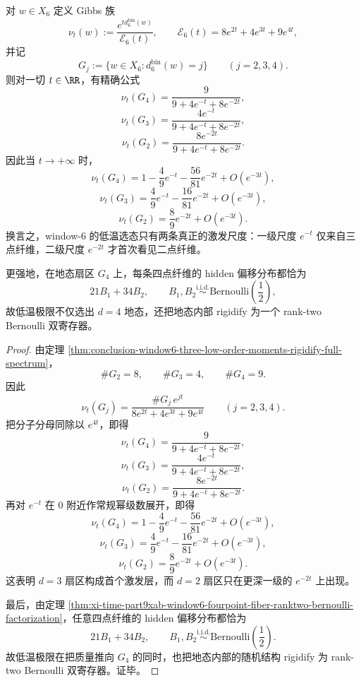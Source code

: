 \begin{theorem}\label{thm:conclusion-window6-two-gap-freezing-ranktwo-bernoulli-groundstate}
对 \(w\in X_6\) 定义 Gibbs 族
\[
\nu_t(w):=\frac{e^{t d_6^{\mathrm{bin}}(w)}}{\mathcal E_6(t)},
\qquad
\mathcal E_6(t)=8e^{2t}+4e^{3t}+9e^{4t},
\]
并记
\[
G_j:=\{w\in X_6:d_6^{\mathrm{bin}}(w)=j\}
\qquad (j=2,3,4).
\]
则对一切 \(t\in \RR\)，有精确公式
\[
\nu_t(G_4)=\frac{9}{9+4e^{-t}+8e^{-2t}},
\]
\[
\nu_t(G_3)=\frac{4e^{-t}}{9+4e^{-t}+8e^{-2t}},
\]
\[
\nu_t(G_2)=\frac{8e^{-2t}}{9+4e^{-t}+8e^{-2t}}.
\]
因此当 \(t\to+\infty\) 时，
\[
\nu_t(G_4)=1-\frac49 e^{-t}-\frac{56}{81}e^{-2t}+O(e^{-3t}),
\]
\[
\nu_t(G_3)=\frac49 e^{-t}-\frac{16}{81}e^{-2t}+O(e^{-3t}),
\]
\[
\nu_t(G_2)=\frac89 e^{-2t}+O(e^{-3t}).
\]
换言之，window-\(6\) 的低温选态只有两条真正的激发尺度：一级尺度 \(e^{-t}\) 仅来自三点纤维，二级尺度 \(e^{-2t}\) 才首次看见二点纤维。

更强地，在地态扇区 \(G_4\) 上，每条四点纤维的 hidden 偏移分布都恰为
\[
21B_1+34B_2,
\qquad
B_1,B_2\stackrel{\mathrm{i.i.d.}}{\sim}\mathrm{Bernoulli}\!\left(\frac12\right),
\]
故低温极限不仅选出 \(d=4\) 地态，还把地态内部 rigidify 为一个 rank-two Bernoulli 双寄存器。
\end{theorem}

\begin{proof}
由定理 \ref{thm:conclusion-window6-three-low-order-moments-rigidify-full-spectrum}，
\[
\#G_2=8,\qquad \#G_3=4,\qquad \#G_4=9.
\]
因此
\[
\nu_t(G_j)=\frac{\#G_j\,e^{jt}}{8e^{2t}+4e^{3t}+9e^{4t}}
\qquad (j=2,3,4).
\]
把分子分母同除以 \(e^{4t}\)，即得
\[
\nu_t(G_4)=\frac{9}{9+4e^{-t}+8e^{-2t}},
\]
\[
\nu_t(G_3)=\frac{4e^{-t}}{9+4e^{-t}+8e^{-2t}},
\]
\[
\nu_t(G_2)=\frac{8e^{-2t}}{9+4e^{-t}+8e^{-2t}}.
\]
再对 \(e^{-t}\) 在 \(0\) 附近作常规幂级数展开，即得
\[
\nu_t(G_4)=1-\frac49 e^{-t}-\frac{56}{81}e^{-2t}+O(e^{-3t}),
\]
\[
\nu_t(G_3)=\frac49 e^{-t}-\frac{16}{81}e^{-2t}+O(e^{-3t}),
\]
\[
\nu_t(G_2)=\frac89 e^{-2t}+O(e^{-3t}).
\]
这表明 \(d=3\) 扇区构成首个激发层，而 \(d=2\) 扇区只在更深一级的 \(e^{-2t}\) 上出现。

最后，由定理 \ref{thm:xi-time-part9xab-window6-fourpoint-fiber-ranktwo-bernoulli-factorization}，任意四点纤维的 hidden 偏移分布都恰为
\[
21B_1+34B_2,
\qquad
B_1,B_2\stackrel{\mathrm{i.i.d.}}{\sim}\mathrm{Bernoulli}\!\left(\frac12\right).
\]
故低温极限在把质量推向 \(G_4\) 的同时，也把地态内部的随机结构 rigidify 为 rank-two Bernoulli 双寄存器。证毕。
\end{proof}


